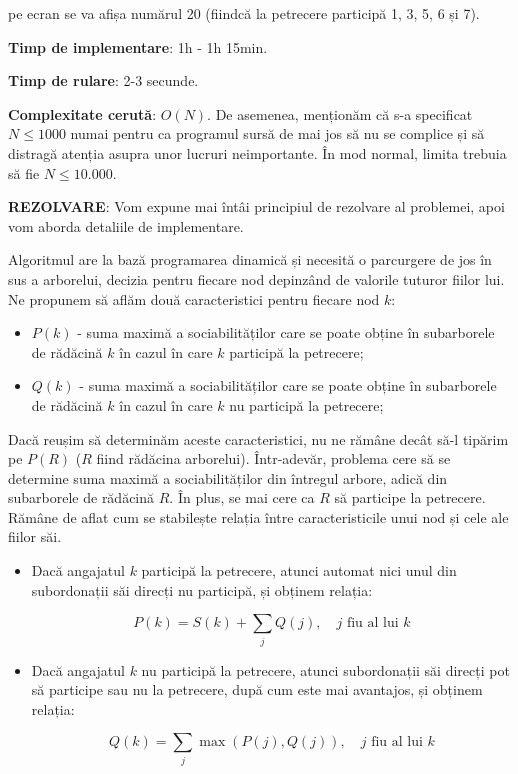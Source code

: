 pe ecran se va afișa numărul 20 (fiindcă la petrecere participă 1, 3, 5, 6 și
7).

{\bf Timp de implementare}: 1h - 1h 15min.

{\bf Timp de rulare}: 2-3 secunde.

{\bf Complexitate cerută}: $O(N)$. De asemenea, menționăm că s-a specificat $N
\leq 1000$ numai pentru ca programul sursă de mai jos să nu se complice și să
distragă atenția asupra unor lucruri neimportante. În mod normal, limita
trebuia să fie $N \leq 10.000$.

{\bf REZOLVARE}: Vom expune mai întâi principiul de rezolvare al problemei,
apoi vom aborda detaliile de implementare.

Algoritmul are la bază programarea dinamică și necesită o parcurgere de jos în
sus a arborelui, decizia pentru fiecare nod depinzând de valorile tuturor
fiilor lui. Ne propunem să aflăm două caracteristici pentru fiecare nod $k$:

\begin{itemize}

\item $P(k)$ - suma maximă a sociabilităților care se poate obține în
  subarborele de rădăcină $k$ în cazul în care $k$ participă la petrecere;

\item $Q(k)$ - suma maximă a sociabilităților care se poate obține în
  subarborele de rădăcină $k$ în cazul în care $k$ nu participă la petrecere;

\end{itemize}

Dacă reușim să determinăm aceste caracteristici, nu ne rămâne decât să-l
tipărim pe $P(R)$ ($R$ fiind rădăcina arborelui). Într-adevăr, problema cere
să se determine suma maximă a sociabilităților din întregul arbore, adică din
subarborele de rădăcină $R$. În plus, se mai cere ca $R$ să participe la
petrecere. Rămâne de aflat cum se stabilește relația între caracteristicile
unui nod și cele ale fiilor săi.

\begin{itemize}

\item Dacă angajatul $k$ participă la petrecere, atunci automat nici unul din
  subordonații săi direcți nu participă, și obținem relația:

  \begin{equation}
    P(k) = S(k) + \sum_j Q(j), \quad j \text{ fiu al lui } k
  \end{equation}

\item Dacă angajatul $k$ nu participă la petrecere, atunci subordonații săi
  direcți pot să participe sau nu la petrecere, după cum este mai avantajos,
  și obținem relația:

  \begin{equation}
    Q(k) = \sum_j \max(P(j), Q(j)), \quad j \text{ fiu al lui } k
  \end{equation}

\end{itemize}

